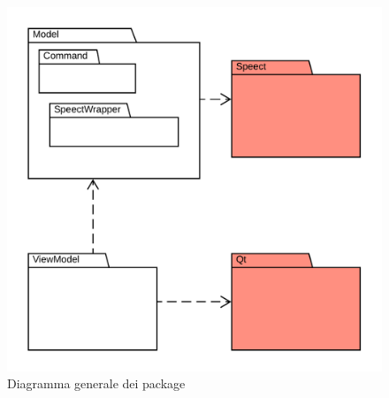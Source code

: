 \documentclass[openany,12pt,a4paper]{report}
\begin{document}
\begin{figure}[H]
	\includegraphics[scale=1.4]{PackageDiagram1}
	\centering
	\caption{Diagramma generale dei package}
\end{figure}

\newpage
\end{document}
